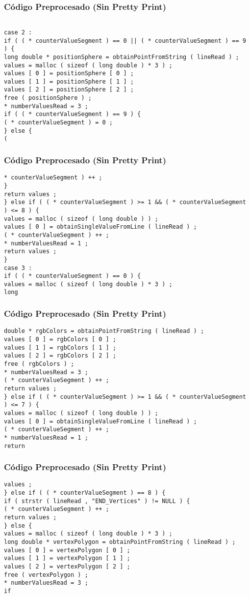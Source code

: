\documentclass{beamer}
\begin{document}
\begin{frame}[fragile]
\frametitle{C\'odigo Preprocesado (Sin Pretty Print)}
\begin{lstlisting}[style=CStyle]

case 2 : 
if ( ( * counterValueSegment ) == 0 || ( * counterValueSegment ) == 9 ) { 
long double * positionSphere = obtainPointFromString ( lineRead ) ; 
values = malloc ( sizeof ( long double ) * 3 ) ; 
values [ 0 ] = positionSphere [ 0 ] ; 
values [ 1 ] = positionSphere [ 1 ] ; 
values [ 2 ] = positionSphere [ 2 ] ; 
free ( positionSphere ) ; 
* numberValuesRead = 3 ; 
if ( ( * counterValueSegment ) == 9 ) { 
( * counterValueSegment ) = 0 ; 
} else { 
( \end{lstlisting}
\end{frame}
\begin{frame}[fragile]
\frametitle{C\'odigo Preprocesado (Sin Pretty Print)}
\begin{lstlisting}[style=CStyle]
* counterValueSegment ) ++ ; 
} 
return values ; 
} else if ( ( * counterValueSegment ) >= 1 && ( * counterValueSegment ) <= 8 ) { 
values = malloc ( sizeof ( long double ) ) ; 
values [ 0 ] = obtainSingleValueFromLine ( lineRead ) ; 
( * counterValueSegment ) ++ ; 
* numberValuesRead = 1 ; 
return values ; 
} 
case 3 : 
if ( ( * counterValueSegment ) == 0 ) { 
values = malloc ( sizeof ( long double ) * 3 ) ; 
long \end{lstlisting}
\end{frame}
\begin{frame}[fragile]
\frametitle{C\'odigo Preprocesado (Sin Pretty Print)}
\begin{lstlisting}[style=CStyle]
double * rgbColors = obtainPointFromString ( lineRead ) ; 
values [ 0 ] = rgbColors [ 0 ] ; 
values [ 1 ] = rgbColors [ 1 ] ; 
values [ 2 ] = rgbColors [ 2 ] ; 
free ( rgbColors ) ; 
* numberValuesRead = 3 ; 
( * counterValueSegment ) ++ ; 
return values ; 
} else if ( ( * counterValueSegment ) >= 1 && ( * counterValueSegment ) <= 7 ) { 
values = malloc ( sizeof ( long double ) ) ; 
values [ 0 ] = obtainSingleValueFromLine ( lineRead ) ; 
( * counterValueSegment ) ++ ; 
* numberValuesRead = 1 ; 
return \end{lstlisting}
\end{frame}
\begin{frame}[fragile]
\frametitle{C\'odigo Preprocesado (Sin Pretty Print)}
\begin{lstlisting}[style=CStyle]
values ; 
} else if ( ( * counterValueSegment ) == 8 ) { 
if ( strstr ( lineRead , "END_Vertices" ) != NULL ) { 
( * counterValueSegment ) ++ ; 
return values ; 
} else { 
values = malloc ( sizeof ( long double ) * 3 ) ; 
long double * vertexPolygon = obtainPointFromString ( lineRead ) ; 
values [ 0 ] = vertexPolygon [ 0 ] ; 
values [ 1 ] = vertexPolygon [ 1 ] ; 
values [ 2 ] = vertexPolygon [ 2 ] ; 
free ( vertexPolygon ) ; 
* numberValuesRead = 3 ; 
if \end{lstlisting}
\end{frame}
\end{document}
